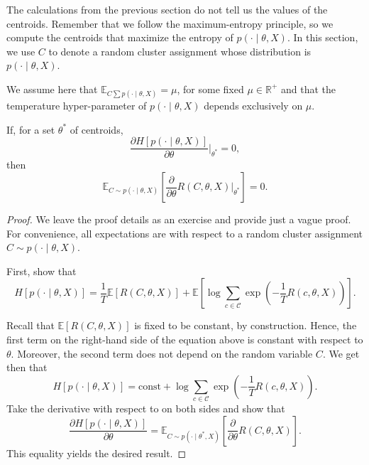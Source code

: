 The calculations from the previous section do not tell us the values of the centroids. Remember that we follow the maximum-entropy principle, so
we compute the centroids that maximize the entropy of $p(\cdot \mid \theta, X)$. In this
section, we use $C$ to denote a random cluster assignment whose distribution
is $p(\cdot \mid \theta, X)$.

We assume here that $\mathbb{E}_{C \sum p(\cdot \mid \theta, X)} = \mu$, for some fixed $\mu \in \mathbb{R}^+$ and that the temperature hyper-parameter
of $p(\cdot \mid \theta, X)$ depends exclusively on $\mu$.

\begin{lemma}
If, for a set $\theta^*$ of centroids,
%
\begin{equation}
\frac{\partial H \left[p(\cdot \mid \theta, X)\right]}{\partial \theta} \Bigr|_{\theta^*} = 0,
\end{equation}
%
then
%
\begin{equation}
\mathbb{E}_{C \sim p(\cdot \mid \theta, X)}\left[\frac{\partial}{\partial \theta}R(C, \theta, X)\Bigr|_{\theta^*}\right] = 0.
\end{equation}
\label{lem:stationarity_condition}
\end{lemma}

\begin{proof}
We leave the proof details as an exercise and provide just a vague
proof. For convenience, all expectations are with respect to a random cluster assignment $C \sim p(\cdot \mid \theta, X)$.

First, show that
%
\begin{equation}
H\left[p(\cdot \mid \theta, X)\right] = \frac{1}{T}\mathbb{E}\left[R(C, \theta, X)\right] + \mathbb{E}\left[\log \sum_{c \in \mathcal{C}} \exp\left(-\frac{1}{T}R(c, \theta, X)\right)\right].
\end{equation}

Recall that $\mathbb{E}\left[R(C, \theta, X)\right]$ is fixed to be constant, by construction. Hence,
the first term on the right-hand side of the equation above is constant with
respect to $\theta$. Moreover, the second term does not depend on the random variable $C$. We get then that
%
\begin{equation}
H[p(\cdot \mid \theta, X)] = \text{const} + \log \sum_{c \in \mathcal{C}} \exp\left(- \frac{1}{T}R(c, \theta, X)\right).
\end{equation}
%
Take the derivative with respect to on both sides and show that
%
\begin{equation}
\frac{\partial H[p\left(\cdot \mid \theta, X\right)]}{\partial \theta} = \mathbb{E}_{C \sim p(\cdot \mid \theta^*, X)} \left[\frac{\partial}{\partial \theta}R(C, \theta, X)\right].
\end{equation}
%
This equality yields the desired result.
\end{proof}

